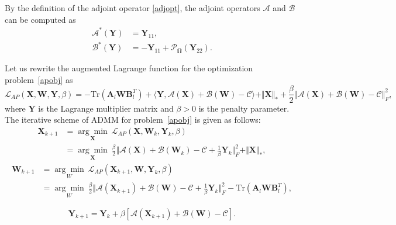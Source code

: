 \documentclass[fontset=windows]{article}
\begin{document}
{By the definition of the adjoint operator \eqref{adjopt}, the adjoint operators  $\mathcal{A}$ and $\mathcal{B}$ can be computed as 
\begin{equation}
    \begin{aligned}
        \mathcal{A}^*(\mathbf Y) & = \mathbf Y_{11}, \\
        \mathcal{B}^*(\mathbf Y) & = -\mathbf Y_{11} + \mathcal{P}_{\mathbf\Omega}(\mathbf Y_{22}).
    \end{aligned}\label{optab}
\end{equation}

Let us rewrite the augmented Lagrange function for the optimization problem~\eqref{apobj} as 
\begin{equation}
\mathcal{L}_{AP}(\mathbf X,\mathbf W,\mathbf Y,\beta) = -\text{Tr}(\mathbf A_l\mathbf W\mathbf B_l^T) + \langle\mathbf Y, \mathcal{A}(\mathbf X)+\mathcal{B}(\mathbf W) -\mathcal{C} \rangle + \Vert\mathbf X \Vert_* + \frac{\beta}{2}\Vert \mathcal{A}(\mathbf X)+\mathcal{B}(\mathbf W) -\mathcal{C} \Vert^2_F,
\end{equation}
where $\mathbf Y$ is the Lagrange multiplier matrix and $\beta >0$ is the penalty parameter. The iterative scheme of ADMM for problem~\eqref{apobj} is given as follows:
    \begin{align}
        \mathbf X_{k+1} & = \underset{\mathbf X}{\arg\min}\  \mathcal{L}_{AP}(\mathbf X, \mathbf W_k,\mathbf Y_k,\beta) \nonumber\\
        & = \underset{\mathbf X}{\arg\min}\ \frac{\beta}{2}\Vert \mathcal{A}(\mathbf X) + \mathcal{B}(\mathbf W_k) - \mathcal{C} + \frac{1}{\beta}\mathbf Y_{k} \Vert_F^2 + \Vert\mathbf X \Vert_*,
        \label{apx}
    \end{align}
    \begin{align}
        \mathbf W_{k+1} & = \underset{W}{\arg\min}\  \mathcal{L}_{AP}(\mathbf X_{k+1},\mathbf W,\mathbf Y_k,\beta)  \nonumber \\
        & = \underset{W}{\arg\min}\ \frac{\beta}{2}\Vert \mathcal{A}(\mathbf X_{k+1}) + \mathcal{B}(\mathbf W) - \mathcal{C} + \frac{1}{\beta}\mathbf Y_{k} \Vert_F^2 -\text{Tr}(\mathbf A_l\mathbf W\mathbf B_l^T),
        \label{apw}
    \end{align}

\begin{equation}
    \mathbf Y_{k+1} = \mathbf Y_{k}+\beta[\mathcal{A}(\mathbf X_{k+1})+\mathcal{B}(\mathbf W)-\mathcal{C}].
    \label{apy}
\end{equation}

}
\end{document}
